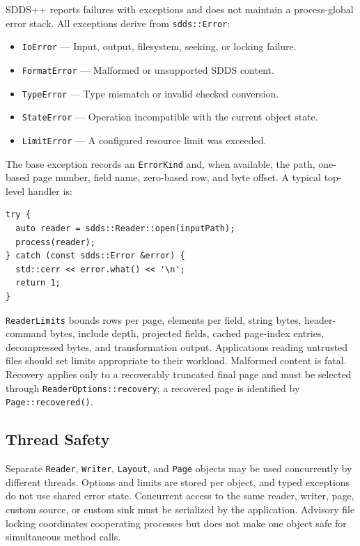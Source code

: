 \documentclass[11pt]{article}
\begin{document}
SDDS++ reports failures with exceptions and does not maintain a process-global
error stack.  All exceptions derive from {\tt sdds::Error}:

\begin{itemize}
\item {\tt IoError} --- Input, output, filesystem, seeking, or locking failure.
\item {\tt FormatError} --- Malformed or unsupported SDDS content.
\item {\tt TypeError} --- Type mismatch or invalid checked conversion.
\item {\tt StateError} --- Operation incompatible with the current object state.
\item {\tt LimitError} --- A configured resource limit was exceeded.
\end{itemize}

The base exception records an {\tt ErrorKind} and, when available, the path,
one-based page number, field name, zero-based row, and byte offset.  A typical
top-level handler is:

\begin{verbatim}
try {
  auto reader = sdds::Reader::open(inputPath);
  process(reader);
} catch (const sdds::Error &error) {
  std::cerr << error.what() << '\n';
  return 1;
}
\end{verbatim}

{\tt ReaderLimits} bounds rows per page, elements per field, string bytes,
header-command bytes, include depth, projected fields, cached page-index
entries, decompressed bytes, and transformation output.  Applications reading
untrusted files should set limits appropriate to their workload.  Malformed
content is fatal.  Recovery applies only to a recoverably truncated final page
and must be selected through {\tt ReaderOptions::recovery}; a recovered page is
identified by {\tt Page::recovered()}.

\subsection{Thread Safety}

Separate {\tt Reader}, {\tt Writer}, {\tt Layout}, and {\tt Page} objects may be
used concurrently by different threads.  Options and limits are stored per
object, and typed exceptions do not use shared error state.  Concurrent access
to the same reader, writer, page, custom source, or custom sink must be
serialized by the application.  Advisory file locking coordinates cooperating
processes but does not make one object safe for simultaneous method calls.
\end{document}
